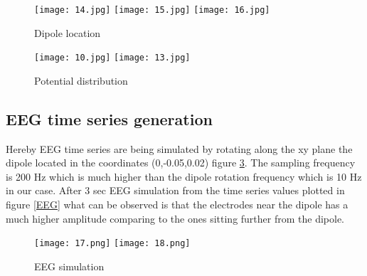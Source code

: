 \begin{figure}[!htbp]
%
    \centering
    \texttt{[image: 14.jpg]}
    \label{D1}
\endminipage\hfill
{}%
    \centering
    \texttt{[image: 15.jpg]}
    \label{D2}
\endminipage\hfill
{}%
    \centering
    \texttt{[image: 16.jpg]}
    \label{D3}
\endminipage\hfill
\caption{Dipole location}
\end{figure}



\begin{figure}[!htbp]
%
    \centering
    \texttt{[image: 10.jpg]}
    \label{FinalPotential}
\endminipage\hfill
{}%
    \centering
    \texttt{[image: 13.jpg]}
     \label{figure_1}
\endminipage\hfill
\caption{Potential distribution}\label{Testified}
\end{figure}


\newpage
\subsection{EEG time series generation}

Hereby EEG time series are being simulated by rotating along the xy plane the dipole located in the coordinates (0,-0.05,0.02) figure \ref{D5}. The sampling frequency is 200 Hz which is much higher than the dipole rotation frequency which is 10 Hz in our case. After 3 sec EEG simulation from the time series values plotted in figure \ref{EEG} what can be observed is that the electrodes near the dipole has a much higher amplitude comparing to the ones sitting further from the dipole.



\begin{figure}[!htbp]
%
    \centering
    \texttt{[image: 17.png]}
    \label{EEG}
\endminipage\hfill
{}%
    \centering
    \texttt{[image: 18.png]}
    \label{D5}
\endminipage\hfill
\caption{EEG simulation}
\end{figure}
